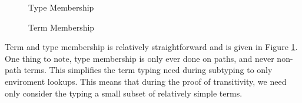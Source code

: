 %

\begin{figure}[h]
\hfill {}
\caption{Type Membership}
\label{f:exp}
\hfill {}
\caption{Term Membership}
\label{f:mem}
\end{figure}
Term and type membership is relatively straightforward and is given in Figure \ref{f:mem}. One thing to note, type membership is only ever done on paths, and never non-path terms. This simplifies the term typing need during subtyping to only enviroment lookups. This means that during the proof of transitivity, we need only consider the typing a small subset of relatively simple terms.


